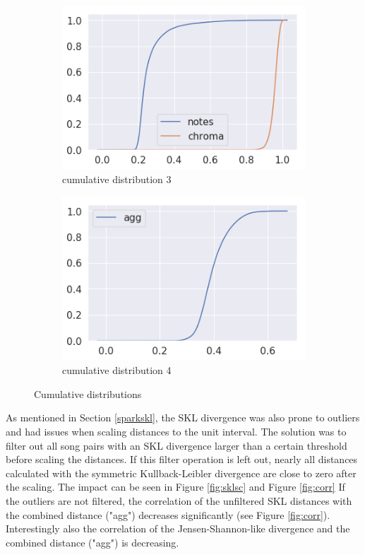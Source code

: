 \begin{figure}[htbp]
{{			\begin{subfigure}{.495\textwidth}
				\centering     
				\includegraphics[scale=0.5]{Images/SparkFeat/cum3.png}
				\caption{cumulative distribution 3}
				\label{cum3}
			\end{subfigure}%
			\begin{subfigure}{.495\textwidth}
				\centering    
				\includegraphics[scale=0.5]{Images/SparkFeat/cum4.png}
				\caption{cumulative distribution 4}
				\label{cum4}
			\end{subfigure}	
	}}
	\caption{Cumulative distributions}
	\label{fig:cumdist}
\end{figure}
\FloatBarrier

\noindent As mentioned in Section \ref{sparkskl}, the SKL divergence was also prone to outliers and had issues when scaling distances to the unit interval. The solution was to filter out all song pairs with an SKL divergence larger than a certain threshold before scaling the distances. If this filter operation is left out, nearly all distances calculated with the symmetric Kullback-Leibler divergence are close to zero after the scaling. The impact can be seen in Figure \ref{fig:sklsc} and Figure \ref{fig:corr}
\noindent If the outliers are not filtered, the correlation of the unfiltered SKL distances with the combined distance ("agg") decreases significantly (see Figure \ref{fig:corr}). Interestingly also the correlation of the Jensen-Shannon-like divergence and the combined distance ("agg") is decreasing. 


